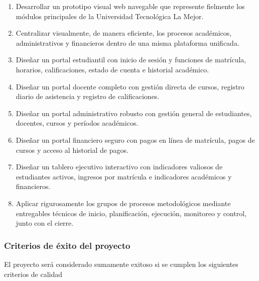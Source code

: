 \documentclass[11pt,spanish]{article}
\begin{document}
\begin{enumerate}
    \item Desarrollar un prototipo visual web navegable que represente fielmente los módulos principales de la Universidad Tecnológica La Mejor.
    \item Centralizar visualmente, de manera eficiente, los procesos académicos, administrativos y financieros dentro de una misma plataforma unificada.
    \item Diseñar un portal estudiantil con inicio de sesión y funciones de matrícula, horarios, calificaciones, estado de cuenta e historial académico.
    \item Diseñar un portal docente completo con gestión directa de cursos, registro diario de asistencia y registro de calificaciones.
    \item Diseñar un portal administrativo robusto con gestión general de estudiantes, docentes, cursos y períodos académicos.
    \item Diseñar un portal financiero seguro con pagos en línea de matrícula, pagos de cursos y acceso al historial de pagos.
    \item Diseñar un tablero ejecutivo interactivo con indicadores valiosos de estudiantes activos, ingresos por matrícula e indicadores académicos y financieros.
    \item Aplicar rigurosamente los grupos de procesos metodológicos mediante entregables técnicos de inicio, planificación, ejecución, monitoreo y control, junto con el cierre.
\end{enumerate}

\subsubsection{Criterios de éxito del proyecto}

El proyecto será considerado sumamente exitoso si se cumplen los siguientes criterios de calidad
\end{document}
